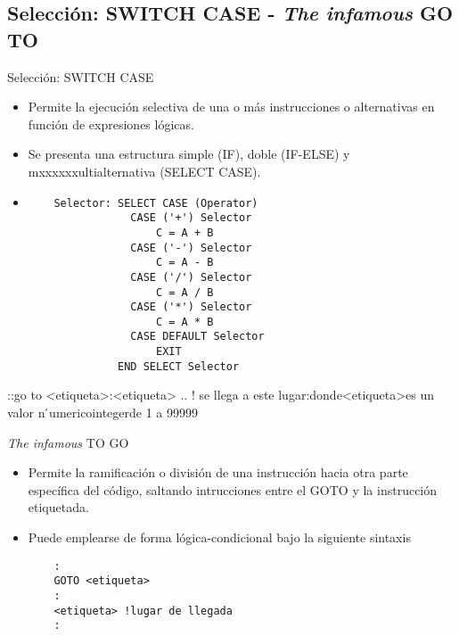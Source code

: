 
\subsection{Selección: SWITCH CASE - \textit{The infamous} GO TO}

\begin{frame}[fragile]{Selección: SWITCH CASE}  
 \begin{itemize}[<+(0)->]
  \item Permite la ejecución selectiva de una o más instrucciones o alternativas en función de expresiones lógicas.
  \item Se presenta una estructura simple (IF), doble (IF-ELSE) y mxxxxxxultialternativa (SELECT CASE).
  \vspace{0.2cm}
  \item [] 
   \begin{verbatim}
    Selector: SELECT CASE (Operator)
                CASE ('+') Selector
                    C = A + B
                CASE ('-') Selector
                    C = A - B
                CASE ('/') Selector
                    C = A / B
                CASE ('*') Selector
                    C = A * B
                CASE DEFAULT Selector
                    EXIT
              END SELECT Selector
   \end{verbatim}
 \end{itemize}
\end{frame}
::go to <etiqueta>:<etiqueta> .. ! se llega a este lugar:donde<etiqueta>es un valor n ́umericointegerde 1 a 99999

\begin{frame}[fragile]{\textit{The infamous} TO GO}  
 \begin{itemize}[<+(0)->]
  \item Permite la ramificación o división de una instrucción hacia otra parte específica del código, saltando intrucciones entre el GOTO y la instrucción etiquetada.
  \item Puede emplearse de forma lógica-condicional bajo la siguiente sintaxis\\
    \begin{verbatim}
    :
    GOTO <etiqueta> 
    : 
    <etiqueta> !lugar de llegada
    :
    \end{verbatim}
 \end{itemize}
\end{frame}

